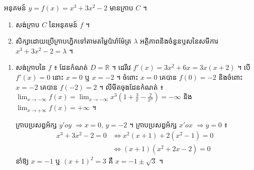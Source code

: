 \begin{example}[ឧទាហរណ៍]
អនុគមន៍ $y = f(x) = x^3 + 3x^2 - 2$ មានក្រាប $C$ ។
\begin{enumerate}[a]
  \item សង់ក្រាប $C$ នៃអនុគមន៍ $f$ ។
  \item សិក្សាដោយប្រើក្រាបហ្វិកទៅតាមតម្លៃប៉ារ៉ាម៉ែត្រ $\lambda$ អត្ថិភាពនិងចំនួនឫសនៃសមីការ $x^3 + 3x^2 - 2 = \lambda$ ។
\end{enumerate}
\end{example}
\ans
\begin{enumerate}[a]
  \item សង់ក្រាបនៃ $f$ ៖ ដែនកំណត់ $D = \mathbb{R}$ ។ ដេរីវេ $f'(x) = 3x^2 + 6x = 3x(x + 2)$ ។ បើ $f'(x) = 0$ នោះ $x = 0$ ឬ $x = -2$ ។ ចំពោះ $x = 0$ គេបាន $f(0) = -2$ និងចំពោះ $x = -2$ គេបាន $f(-2) = 2$ ។ លីមីតចុងដែនកំណត់ ៖ $\displaystyle\lim_{x \to -\infty} f(x) = \lim_{x \to -\infty} x^3\left(1 + \frac{3}{x} - \frac{2}{x^3}\right) = -\infty$ និង $\displaystyle\lim_{x \to +\infty} f(x) = +\infty$ ។
  \begin{center}
  \end{center}
  ក្រាបប្រសព្វអ័ក្ស $y'oy$ $\Rightarrow x = 0$, $y = -2$ ។ ក្រាបប្រសព្វអ័ក្ស $x'ox$ $\Rightarrow y = 0$ ៖
  \[ \begin{aligned} x^3 + 3x^2 - 2 = 0 &\Leftrightarrow x^2(x + 1) + 2(x^2 - 1) = 0\\ &\Leftrightarrow (x + 1)(x^2 + 2x - 2) = 0 \end{aligned} \]
  នាំឱ្យ $x = -1$ ឬ $(x + 1)^2 = 3$ គឺ $x = -1 \pm\sqrt{3}$ ។
  \begin{center}
  \end{center}

\end{enumerate}
